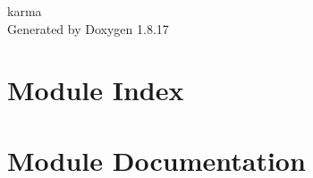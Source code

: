 \let\mypdfximage\pdfximage\def\pdfximage{\immediate\mypdfximage}\documentclass[twoside]{book}
\newcommand{\+}{\discretionary{\mbox{\scriptsize$\hookleftarrow$}}{}{}}
\newcommand{\clearemptydoublepage}{%
  \newpage{\pagestyle{empty}\cleardoublepage}%
}
\begin{document}
\begin{titlepage}
\vspace*{7cm}
\begin{center}%
{\Large karma }\\
\vspace*{1cm}
{\large Generated by Doxygen 1.8.17}\\
\end{center}
\end{titlepage}
\clearemptydoublepage
{}
\tableofcontents
\clearemptydoublepage
{}

\chapter{Module Index}

\chapter{Module Documentation}





\backmatter
\newpage
{}
\clearemptydoublepage
{}
\printindex
\end{document}
